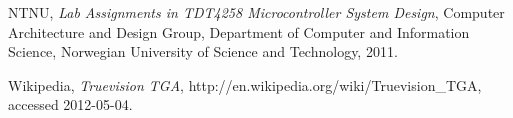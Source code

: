 \begin{thebibliography}{9}

    NTNU,
    \emph{Lab Assignments in TDT4258 Microcontroller System Design},
    Computer Architecture and Design Group,
    Department of Computer and Information Science,
    Norwegian University of Science and Technology,
    2011.

    Wikipedia,
    \emph{Truevision TGA},
    http://en.wikipedia.org/wiki/Truevision\_TGA,
    accessed 2012-05-04.

\end{thebibliography}
